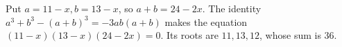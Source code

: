 Put $a=11-x,b=13-x$, so $a+b=24-2x$. The identity $a^3+b^3-(a+b)^3=-3ab(a+b)$ makes the equation $(11-x)(13-x)(24-2x)=0$. Its roots are $11,13,12$, whose sum is $\boxed{36}$.
